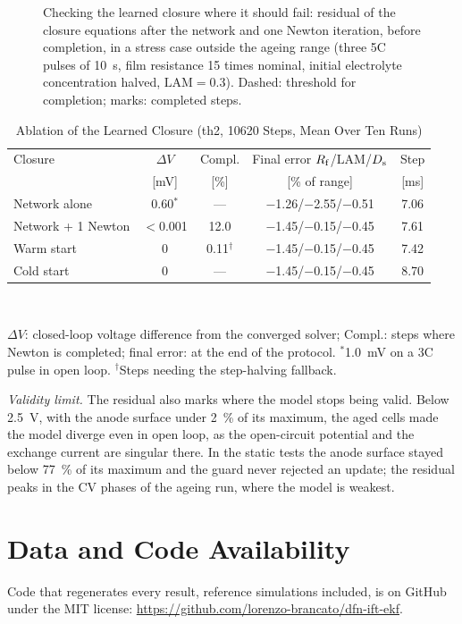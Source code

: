 \documentclass[journal]{IEEEtran}
\newcommand{\LAM}{\mathrm{LAM}}\newcommand{\LLI}{\mathrm{LLI}}\newcommand{\phipl}{\phi_{\mathrm{pl}}}
\begin{document}
\begin{figure}[t]
\centering

\caption{Checking the learned closure where it should fail: residual of the closure equations after the network and one Newton iteration, before completion, in a stress case outside the ageing range (three 5C pulses of \SI{10}{\second}, film resistance 15 times nominal, initial electrolyte concentration halved, $\LAM=0.3$). Dashed: threshold for completion; marks: completed steps.}
\label{fig:residual}
\end{figure}

\begin{table}[t]
\centering
\caption{Ablation of the Learned Closure (th2, \num{10620} Steps, Mean Over Ten Runs)}
\label{tab:ablation}
\footnotesize\setlength{\tabcolsep}{3pt}
\begin{tabular}{@{}lcccc@{}}
\toprule
Closure & $\Delta V$ & Compl. & Final error $R_{\mathrm{f}}$/$\LAM$/$D_{\mathrm{s}}$ & Step\\
 & [mV] & [\%] & [\% of range] & [ms]\\
\midrule
Network alone & 0.60$^{\ast}$ & --- & $-$1.26/$-$2.55/$-$0.51 & 7.06\\
Network + 1 Newton & $<$0.001 & 12.0 & $-$1.45/$-$0.15/$-$0.45 & 7.61\\
Warm start & 0 & 0.11$^{\dagger}$ & $-$1.45/$-$0.15/$-$0.45 & 7.42\\
Cold start & 0 & --- & $-$1.45/$-$0.15/$-$0.45 & 8.70\\
\bottomrule
\end{tabular}\\[2pt]
\parbox{\columnwidth}{\footnotesize $\Delta V$: closed-loop voltage difference from the converged solver; Compl.: steps where Newton is completed; final error: at the end of the protocol. $^{\ast}$\SI{1.0}{\milli\volt} on a 3C pulse in open loop. $^{\dagger}$Steps needing the step-halving fallback.}
\end{table}

\emph{Validity limit.} The residual also marks where the model stops being valid. Below \SI{2.5}{\volt}, with the anode surface under \SI{2}{\percent} of its maximum, the aged cells made the model diverge even in open loop, as the open-circuit potential and the exchange current are singular there. In the static tests the anode surface stayed below \SI{77}{\percent} of its maximum and the guard never rejected an update; the residual peaks in the CV phases of the ageing run, where the model is weakest.

\section*{Data and Code Availability}
Code that regenerates every result, reference simulations included, is on GitHub under the MIT license: \url{https://github.com/lorenzo-brancato/dfn-ift-ekf}.
\end{document}
